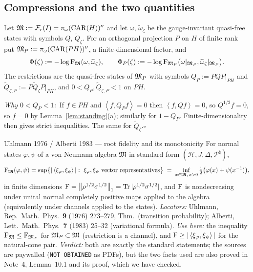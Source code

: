 \documentclass[11pt]{article}
\newcommand{\norm}[1]{\left\lVert #1\right\rVert}
\newcommand{\ip}[2]{\left\langle #1,#2\right\rangle}
\newcommand{\CAR}{\operatorname{CAR}}
\newcommand{\Qt}{\widetilde Q}
\theoremstyle{definition}\newtheorem{problem}[theorem]{Problem}
\begin{document}

\subsection{Compressions and the two quantities}\label{sec:compress}

\begin{definition}\label{def:PhiP}
Let \(\cM:=\cF_r(I)=\pi_\omega(\CAR(H))''\) and let \(\omega\), \(\widetilde\omega_\zeta\) be the
gauge-invariant quasi-free states with symbols \(Q\), \(\Qt_\zeta\).  For an orthogonal projection
\(P\) on \(H\) of finite rank put \(\cM_P:=\pi_\omega(\CAR(PH))''\), a finite-dimensional factor, and
\[
 \Phi(\zeta):=-\log\operatorname{F}_{\mathfrak M}(\omega,\widetilde\omega_\zeta),\qquad
 \Phi_P(\zeta):=-\log\operatorname{F}_{\mathfrak M_P}\bigl(\omega|_{\mathfrak M_P},\widetilde\omega_\zeta|_{\mathfrak M_P}\bigr).
\]
The restrictions are the quasi-free states of \(\mathfrak M_P\) with symbols
\(Q_P:=PQP|_{PH}\) and \(\Qt_{\zeta,P}:=P\Qt_\zeta P|_{PH}\), and \(0<Q_P,\Qt_{\zeta,P}<1\) on \(PH\).
\end{definition}

\medskip\noindent\textit{Why \(0<Q_P<1\):}\ 
If \(f\in PH\) and \(\ip f{Q_Pf}=0\) then \(\ip f{Qf}=0\), so \(Q^{1/2}f=0\), so \(f=0\) by
Lemma~\ref{lem:standing}(a); similarly for \(1-Q_P\).  Finite-dimensionality then gives strict
inequalities.  The same for \(\Qt_\zeta\).\hfill\(\square\)\medskip

\begin{citedbox}{Uhlmann 1976 / Alberti 1983 --- root fidelity and its monotonicity}
For normal states \(\varphi,\psi\) of a von Neumann algebra \(\mathfrak M\) in standard form
\((\mathcal H,J,\Delta,\mathcal P^\natural)\),
\[
 \Fid_\cM(\varphi,\psi)=\sup\bigl\{|\ip{\xi_\varphi}{\xi_\psi}|:\ \xi_\varphi,\xi_\psi\ \text{vector
 representatives}\bigr\}
 \;=\;\inf_{x\in\cM,\,x>0}\tfrac12\bigl(\varphi(x)+\psi(x^{-1})\bigr),
\]
in finite dimensions \(\Fid=\norm{\rho^{1/2}\sigma^{1/2}}_1=\Tr|\rho^{1/2}\sigma^{1/2}|\), and
\(\operatorname{F}\) is nondecreasing under unital normal completely positive maps applied to the algebra
(equivalently under channels applied to the states).  \emph{Locators:} Uhlmann, Rep.\ Math.\ Phys.\
\textbf{9} (1976) 273--279, Thm.\ (transition probability); Alberti, Lett.\ Math.\ Phys.\ \textbf{7}
(1983) 25--32 (variational formula).  \emph{Use here:} the inequality \(\operatorname{F}_\mathfrak M\le\operatorname{F}_{\mathfrak M_P}\) for
\(\mathfrak M_P\subset\mathfrak M\) (restriction is a channel), and \(\Fid\ge|\ip{\xi_\varphi}{\xi_\psi}|\) for the
natural-cone pair.  \emph{Verdict:} both are exactly the standard statements; the sources are
paywalled (\texttt{NOT OBTAINED} as PDFs), but the two facts used are also proved in Note~4,
Lemma~10.1 and its proof, which we have checked.
\end{citedbox}
\end{document}
